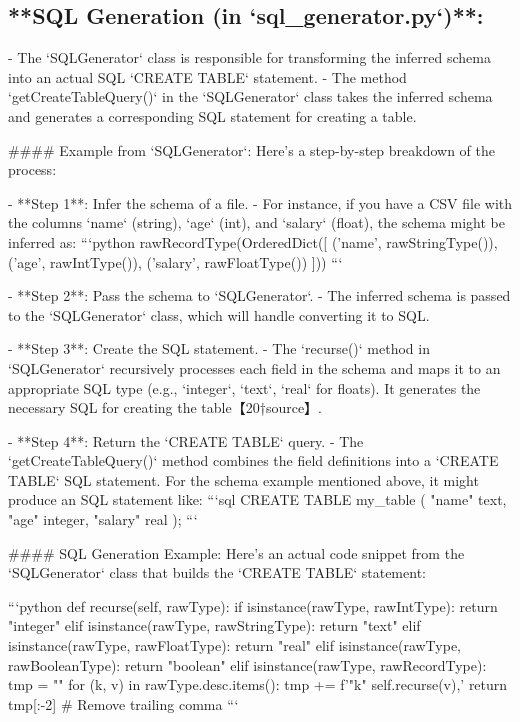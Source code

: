 \documentclass[sigconf,natbib=false]{acmart}
\begin{document}
\begin{draft}
\subsection{**SQL Generation (in `sql_generator.py`)**:}
   - The `SQLGenerator` class is responsible for transforming the inferred schema into an actual SQL `CREATE TABLE` statement.
   - The method `getCreateTableQuery()` in the `SQLGenerator` class takes the inferred schema and generates a corresponding SQL statement for creating a table.

#### Example from `SQLGenerator`:
Here’s a step-by-step breakdown of the process:

- **Step 1**: Infer the schema of a file.
   - For instance, if you have a CSV file with the columns `name` (string), `age` (int), and `salary` (float), the schema might be inferred as:
     ```python
     rawRecordType(OrderedDict([
         ('name', rawStringType()), 
         ('age', rawIntType()), 
         ('salary', rawFloatType())
     ]))
     ```

- **Step 2**: Pass the schema to `SQLGenerator`.
   - The inferred schema is passed to the `SQLGenerator` class, which will handle converting it to SQL.

- **Step 3**: Create the SQL statement.
   - The `recurse()` method in `SQLGenerator` recursively processes each field in the schema and maps it to an appropriate SQL type (e.g., `integer`, `text`, `real` for floats). It generates the necessary SQL for creating the table【20†source】.

- **Step 4**: Return the `CREATE TABLE` query.
   - The `getCreateTableQuery()` method combines the field definitions into a `CREATE TABLE` SQL statement. For the schema example mentioned above, it might produce an SQL statement like:
     ```sql
     CREATE TABLE my_table (
         "name" text,
         "age" integer,
         "salary" real
     );
     ```

#### SQL Generation Example:
Here's an actual code snippet from the `SQLGenerator` class that builds the `CREATE TABLE` statement:

```python
def recurse(self, rawType):
    if isinstance(rawType, rawIntType):
        return "integer"
    elif isinstance(rawType, rawStringType):
        return "text"
    elif isinstance(rawType, rawFloatType):
        return "real"
    elif isinstance(rawType, rawBooleanType):
        return "boolean"
    elif isinstance(rawType, rawRecordType):
        tmp = ""
        for (k, v) in rawType.desc.items():
            tmp += f'"{k}" {self.recurse(v)},\n'
        return tmp[:-2]  # Remove trailing comma
```


\end{draft}
\end{document}
